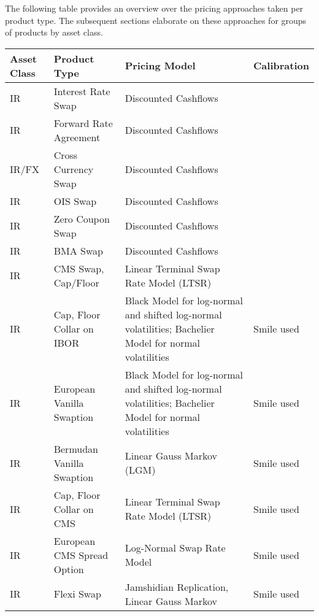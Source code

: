 
The following table provides an overview over the pricing approaches taken per product type.
The subsequent sections elaborate on these approaches for groups of products by asset class.

\medskip

{\footnotesize
\begin{supertabular}{|p{1cm}|p{5cm}|p{5cm}|p{2cm}|}
\hline
Asset Class & Product Type & Pricing Model & Calibration \\
\hline
\hline
IR & 
Interest Rate Swap & 
Discounted Cashflows	&
\\
\hline
IR	&
Forward Rate Agreement	&
Discounted Cashflows &
\\
\hline
IR/FX & 
Cross Currency Swap & 
Discounted Cashflows &	 
\\
\hline
IR & 
OIS Swap & 
Discounted Cashflows & 
\\
\hline
IR & 
Zero Coupon Swap & 
Discounted Cashflows & 
\\
\hline
IR & 
BMA Swap & 
Discounted Cashflows & 
\\
\hline
IR & 
CMS Swap, Cap/Floor & 
Linear Terminal Swap Rate Model (LTSR) & 
\\
\hline
IR & 
Cap, Floor Collar on IBOR & 
Black Model for log-normal and shifted log-normal volatilities;
Bachelier Model for normal volatilities	& 
Smile used \\
\hline
IR	&
European Vanilla Swaption	&
Black Model for log-normal and shifted log-normal volatilities;
Bachelier Model for normal volatilities	&
Smile used \\
\hline
IR	&
Bermudan Vanilla Swaption	& 
Linear Gauss Markov (LGM)	&
Smile used \\
\hline
IR & 
Cap, Floor Collar on CMS &	
Linear Terminal Swap Rate Model (LTSR) & 
Smile used \\
\hline
IR	&
European CMS Spread Option &
Log-Normal Swap Rate Model  &
Smile used \\
\hline
IR	&
Flexi Swap	&
Jamshidian Replication, Linear Gauss Markov &
Smile used \\

\end{supertabular}}
